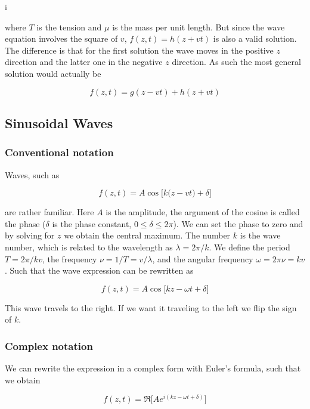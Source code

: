 i\documentclass[a4paper]{article}
\begin{document}
where $T$ is the tension and $\mu$ is the mass per unit length. But since the wave equation involves the square of $v$, $f(z, t)=h(z+vt)$ is also a valid solution. The difference is that for the first solution the wave moves in the positive $z$ direction and the latter one in the negative $z$ direction. As such the most general solution would actually be

\begin{equation}
    f(z, t)= g(z-vt) + h(z+vt)
\end{equation}

\subsection{Sinusoidal Waves}

\subsubsection*{Conventional notation}

Waves, such as

\begin{equation}
    f(z, t) = A\cos\big[k\big(z-vt\big)+\delta\big]
\end{equation}

are rather familiar. Here $A$ is the amplitude, the argument of the cosine is called the phase ($\delta$ is the phase constant, $0\le\delta\le 2\pi$). We can set the phase to zero and by solving for $z$ we obtain the central maximum. The number $k$ is the wave number, which is related to the wavelength as $\lambda=2\pi/k$. We define the period $T=2\pi/kv$, the frequency $\nu=1/T=v/\lambda$, and the angular frequency $\omega=2\pi \nu=kv$. Such that the wave expression can be rewritten as

\begin{equation}
    f(z, t) = A\cos\big[kz-\omega t + \delta]
\end{equation}

This wave travels to the right. If we want it traveling to the left we flip the sign of $k$. 

\subsubsection*{Complex notation}

We can rewrite the expression in a complex form with Euler's formula, such that we obtain

\begin{equation}
    f(z, t) = \Re\big[Ae^{i(kz-\omega t+\delta)}\big]
\end{equation}
\end{document}
